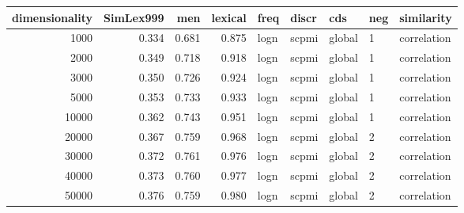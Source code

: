 \begin{tabular}{rrrrlllll}
\toprule
 dimensionality &  SimLex999 &    men &  lexical &  freq &  discr &     cds & neg &   similarity \\
\midrule
           1000 &      0.334 &  0.681 &    0.875 &  logn &  scpmi &  global &   1 &  correlation \\
           2000 &      0.349 &  0.718 &    0.918 &  logn &  scpmi &  global &   1 &  correlation \\
           3000 &      0.350 &  0.726 &    0.924 &  logn &  scpmi &  global &   1 &  correlation \\
           5000 &      0.353 &  0.733 &    0.933 &  logn &  scpmi &  global &   1 &  correlation \\
          10000 &      0.362 &  0.743 &    0.951 &  logn &  scpmi &  global &   1 &  correlation \\
          20000 &      0.367 &  0.759 &    0.968 &  logn &  scpmi &  global &   2 &  correlation \\
          30000 &      0.372 &  0.761 &    0.976 &  logn &  scpmi &  global &   2 &  correlation \\
          40000 &      0.373 &  0.760 &    0.977 &  logn &  scpmi &  global &   2 &  correlation \\
          50000 &      0.376 &  0.759 &    0.980 &  logn &  scpmi &  global &   2 &  correlation \\
\bottomrule
\end{tabular}
